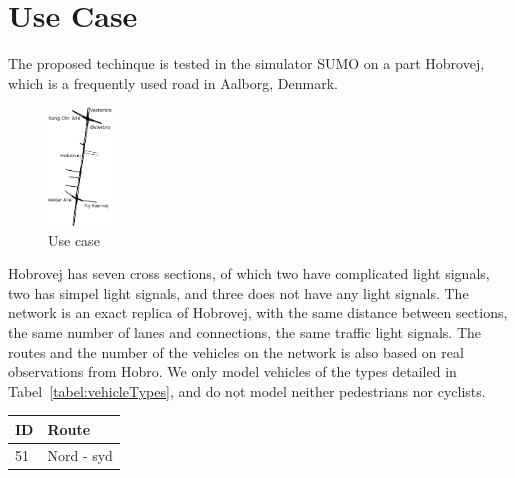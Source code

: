 \section{Use Case}
The proposed techinque is tested in the simulator SUMO on a part Hobrovej, which is a frequently used road in Aalborg, Denmark.

\begin{figure}[htb]
\centering
\includegraphics[width=0.15\textwidth]{images/Hobrovej.png}
\caption{Use case}
\label{fig:Introduction:hobro}
\end{figure}

Hobrovej has seven cross sections, of which two have complicated light signals, two has simpel light signals, and three does not have any light signals. %
The network is an exact replica of Hobrovej, with the same distance between sections, the same number of lanes and connections, the same traffic light signals.
The routes and the number of the vehicles on the network is also based on real observations from Hobro.
We only model vehicles of the types detailed in Tabel~\ref{tabel:vehicleTypes}, and do not model neither pedestrians nor cyclists.

\begin{tabular}{|l|l|}\hline
\textbf{ID} & \textbf{Route}\\\hline
51 & Nord - syd\\\hline
\end{tabular}
